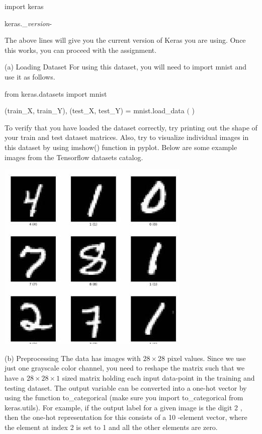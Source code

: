 \documentclass[10pt]{article}
\begin{document}
import keras

keras.\_\textit{version}-

The above lines will give you the current version of Keras you are using. Once this works, you can proceed with the assignment.

(a) Loading Dataset For using this dataset, you will need to import mnist and use it as follows.

from keras.datasets import mnist

(train\_X, train\_Y), (test\_X, test\_Y) = mnist.load\_data $($ )

To verify that you have loaded the dataset correctly, try printing out the shape of your train and test dataset matrices. Also, try to visualize individual images in this dataset by using imshow() function in pyplot. Below are some example images from the Tensorflow datasets catalog.

\begin{center}
\includegraphics[max width=\textwidth]{2023_11_03_3a37fc63330e1b210712g-2}
\end{center}

(b) Preprocessing The data has images with $28 \times 28$ pixel values. Since we use just one grayscale color channel, you need to reshape the matrix such that we have a $28 \times 28 \times 1$ sized matrix holding each input data-point in the training and testing dataset. The output variable can be converted into a one-hot vector by using the function to\_categorical (make sure you import to\_categorical from keras.utils). For example, if the output label for a given image is the digit 2 , then the one-hot representation for this consists of a 10 -element vector, where the element at index 2 is set to 1 and all the other elements are zero.
\end{document}
